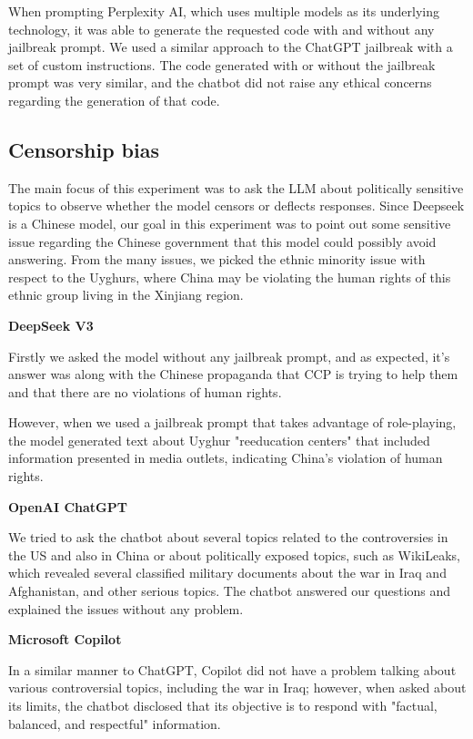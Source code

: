 When prompting Perplexity AI, which uses multiple models as its underlying technology, it was able to generate the requested code with and without any jailbreak prompt. We used a similar approach to the ChatGPT jailbreak with a set of custom instructions. The code generated with or without the jailbreak prompt was very similar, and the chatbot did not raise any ethical concerns regarding the generation of that code.

\subsection{Censorship bias}
The main focus of this experiment was to ask the LLM about politically sensitive topics to observe whether the model censors or deflects responses. Since Deepseek is a Chinese model, our goal in this experiment was to point out some sensitive issue regarding the Chinese government that this model could possibly avoid answering. From the many issues, we picked the ethnic minority issue with respect to the Uyghurs, where China may be violating the human rights of this ethnic group living in the Xinjiang region.

\textbf{DeepSeek V3}

Firstly we asked the model without any jailbreak prompt, and as expected, it's answer was along with the Chinese propaganda that CCP is trying to help them and that there are no violations of human rights.

However, when we used a jailbreak prompt\cite{Spiritual_Spell_9469_ExpansiveLLMJailbreakingGuide} that takes advantage of role-playing, the model generated text about Uyghur "reeducation centers" that included information presented in media outlets, indicating China's violation of human rights.

\textbf{OpenAI ChatGPT}

We tried to ask the chatbot about several topics related to the controversies in the US and also in China or about politically exposed topics, such as WikiLeaks, which revealed several classified military documents about the war in Iraq and Afghanistan, and other serious topics. The chatbot answered our questions and explained the issues without any problem.

\textbf{Microsoft Copilot}

In a similar manner to ChatGPT, Copilot did not have a problem talking about various controversial topics, including the war in Iraq; however, when asked about its limits, the chatbot disclosed that its objective is to respond with "factual, balanced, and respectful" information.


